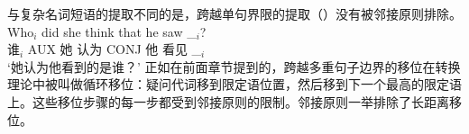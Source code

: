 与复杂名词短语的提取不同的是，跨越单句界限的提取（）没有被邻接原则排除。
\ea
\gll Who$_i$ did she think that he saw \_$_i$?\\
谁$_i$ AUX 她 认为 CONJ 他 看见 \_$_i$\\
\glt `她认为他看到的是谁？'
\z
正如在前面章节提到的，跨越多重句子边界的移位在转换理论中被叫做循环移位：疑问代词移到限定语位置，然后移到下一个最高的限定语上。这些移位步骤的每一步都受到邻接原则的限制。邻接原则一举排除了长距离移位。


